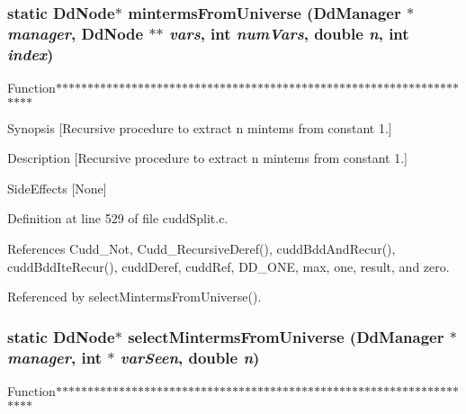 \subsubsection{\setlength{\rightskip}{0pt plus 5cm}static \bf{Dd\-Node}$\ast$ minterms\-From\-Universe (\bf{Dd\-Manager} $\ast$ {\em manager}, \bf{Dd\-Node} $\ast$$\ast$ {\em vars}, int {\em num\-Vars}, double {\em n}, int {\em index})\hspace{0.3cm}{\tt  [static]}}\label{cuddSplit_8c_63b184f06bfc153c7442659c665dd5c1}


Function$\ast$$\ast$$\ast$$\ast$$\ast$$\ast$$\ast$$\ast$$\ast$$\ast$$\ast$$\ast$$\ast$$\ast$$\ast$$\ast$$\ast$$\ast$$\ast$$\ast$$\ast$$\ast$$\ast$$\ast$$\ast$$\ast$$\ast$$\ast$$\ast$$\ast$$\ast$$\ast$$\ast$$\ast$$\ast$$\ast$$\ast$$\ast$$\ast$$\ast$$\ast$$\ast$$\ast$$\ast$$\ast$$\ast$$\ast$$\ast$$\ast$$\ast$$\ast$$\ast$$\ast$$\ast$$\ast$$\ast$$\ast$$\ast$$\ast$$\ast$$\ast$$\ast$$\ast$$\ast$$\ast$$\ast$$\ast$$\ast$

Synopsis [Recursive procedure to extract n mintems from constant 1.]

Description [Recursive procedure to extract n mintems from constant 1.]

Side\-Effects [None] 

Definition at line 529 of file cudd\-Split.c.

References Cudd\_\-Not, Cudd\_\-Recursive\-Deref(), cudd\-Bdd\-And\-Recur(), cudd\-Bdd\-Ite\-Recur(), cudd\-Deref, cudd\-Ref, DD\_\-ONE, max, one, result, and zero.

Referenced by select\-Minterms\-From\-Universe().
\subsubsection{\setlength{\rightskip}{0pt plus 5cm}static \bf{Dd\-Node}$\ast$ select\-Minterms\-From\-Universe (\bf{Dd\-Manager} $\ast$ {\em manager}, int $\ast$ {\em var\-Seen}, double {\em n})\hspace{0.3cm}{\tt  [static]}}\label{cuddSplit_8c_4b941856ebf556e24817642ef7d5dee8}


Function$\ast$$\ast$$\ast$$\ast$$\ast$$\ast$$\ast$$\ast$$\ast$$\ast$$\ast$$\ast$$\ast$$\ast$$\ast$$\ast$$\ast$$\ast$$\ast$$\ast$$\ast$$\ast$$\ast$$\ast$$\ast$$\ast$$\ast$$\ast$$\ast$$\ast$$\ast$$\ast$$\ast$$\ast$$\ast$$\ast$$\ast$$\ast$$\ast$$\ast$$\ast$$\ast$$\ast$$\ast$$\ast$$\ast$$\ast$$\ast$$\ast$$\ast$$\ast$$\ast$$\ast$$\ast$$\ast$$\ast$$\ast$$\ast$$\ast$$\ast$$\ast$$\ast$$\ast$$\ast$$\ast$$\ast$$\ast$$\ast$

